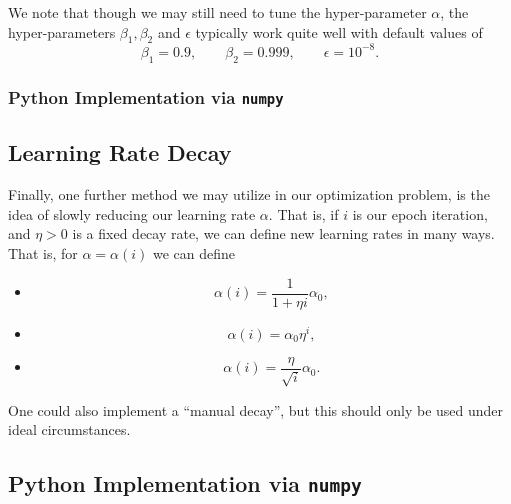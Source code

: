 We note that though we may still need to tune the hyper-parameter $\alpha$, the hyper-parameters $\beta_1,\beta_2$ and $\epsilon$ typically work quite well with default values of
$$\beta_1=0.9,\qquad\beta_2=0.999,\qquad\epsilon=10^{-8}.$$



\subsubsection{Python Implementation via \texttt{numpy}}






\subsection{Learning Rate Decay}

Finally, one further method we may utilize in our optimization problem, is the idea of slowly reducing our learning rate $\alpha$.  That is, if $i$ is our epoch iteration, and $\eta>0$ is a fixed decay rate, we can define new learning rates in many ways.  That is, for $\alpha=\alpha(i)$ we can define
\begin{itemize}
	\item $$\alpha(i)=\frac{1}{1+\eta i}\alpha_0,$$
	\item $$\alpha(i)=\alpha_0\eta^i,$$
	\item $$\alpha(i)=\frac{\eta}{\sqrt{i}}\alpha_0.$$
\end{itemize}
One could also implement a ``manual decay'', but this should only be used under ideal circumstances.



\subsection{Python Implementation via \texttt{numpy}}







